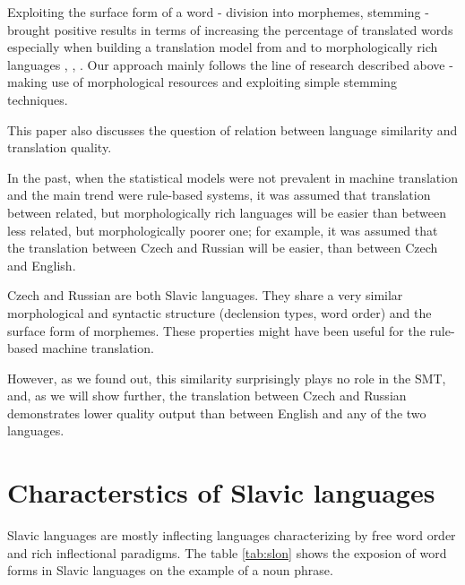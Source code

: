 \documentclass[11pt,letterpaper]{article}
\begin{document}
Exploiting the surface form of a word - division into morphemes, stemming - brought
positive results in terms of increasing the percentage of translated words 
especially when building a translation  model from and to morphologically rich languages \cite{popovic},
\cite{oflazer}, \cite{gispert}.  
Our approach mainly follows the line of research described above - making use of 
morphological resources and exploiting simple stemming techniques.

This paper also discusses the question of relation between language similarity and translation quality.

In the past, when the statistical models were not prevalent in machine translation and the main trend were rule-based systems, it was assumed that translation between related, but morphologically rich languages will be easier than between less related, but morphologically poorer one; for example, it was assumed that the translation between Czech and Russian will be easier, than between Czech and English.

Czech and Russian are both Slavic languages. They share a very similar morphological and syntactic
structure (declension types, word order) and the surface form of morphemes. These properties 
might have been useful for the rule-based machine translation. 

However, as we found out, this similarity surprisingly
 plays no role in the SMT, and, as we will show further,
the translation between Czech and Russian demonstrates lower quality output than 
between English and any of the two languages.

\section{Characterstics of Slavic languages}
Slavic languages are mostly inflecting languages characterizing by free word order and rich
inflectional paradigms. %
The table \ref{tab:slon} shows the exposion of word forms in Slavic languages on
the example of a noun phrase.
\end{document}
